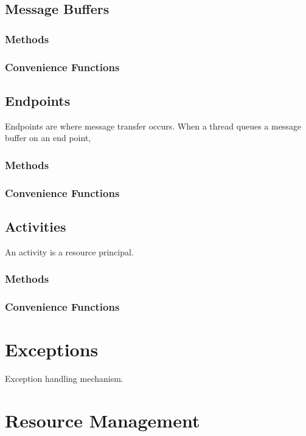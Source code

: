 \clearpage
\section{Message Buffers}

\subsection{Methods}

\subsection{Convenience Functions}

\clearpage
\section{Endpoints}

Endpoints are where message transfer occurs.  When a thread queues a
message buffer on an end point, 

\subsection{Methods}

\subsection{Convenience Functions}

\clearpage
\section{Activities}

An activity is a resource principal.

\subsection{Methods}

\subsection{Convenience Functions}

\chapter{Exceptions}

Exception handling mechanism.

\chapter{Resource Management}
